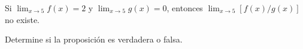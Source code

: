 \item Si $\lim_{x \to 5} f(x) = 2$ y $\lim_{x \to 5} g(x) = 0$, entonces $\lim_{x \to 5} [f(x)/g(x)]$ no existe.
\par
Determine si la proposición es verdadera o falsa.
